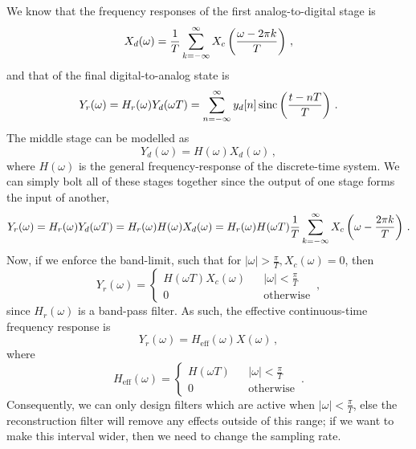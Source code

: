 We know that the frequency responses of the first analog-to-digital stage is
%
\begin{displaymath}
  X_d(\omega) = \frac{1}{T}\sum_{k=-\infty}^\infty X_c\left(\frac{\omega - 2\pi k}{T}\right) \,,
\end{displaymath}
%
and that of the final digital-to-analog state is
%
\begin{displaymath}
  Y_r(\omega) = H_r(\omega)Y_d(\omega T) = \sum_{n=-\infty}^\infty y_d[n]\operatorname{sinc}\left(\frac{t - nT}{T}\right) \,.
\end{displaymath}
%
The middle stage can be modelled as
%
\begin{displaymath}
  Y_d(\omega) = H(\omega)X_d(\omega) \,,
\end{displaymath}
%
where $H(\omega)$ is the general frequency-response of the discrete-time system.
We can simply bolt all of these stages together since the output of one
stage forms the input of another,
%
\begin{displaymath}
  Y_r(\omega) = H_r(\omega)Y_d(\omega T) = H_r(\omega)H(\omega)X_d(\omega)
  = H_r(\omega)H(\omega T)\frac{1}{T}\sum_{k=-\infty}^\infty X_c\left(\omega -\frac{2\pi k}{T}\right) \,.
\end{displaymath}
%
Now, if we enforce the band-limit, such that for $|\omega| > \frac{\pi}{T}, X_c(\omega) = 0$,
then
%
\begin{displaymath}
  Y_r(\omega) = \left\{\begin{array}{ccl}
  H(\omega T)X_c(\omega) & & |\omega| < \frac{\pi}{T} \\
  0 & & \mathrm{otherwise}
  \end{array}\right. \,,
\end{displaymath}
%
since $H_r(\omega)$ is a band-pass filter. As such, the effective continuous-time frequency
response is
%
\begin{displaymath}
  Y_r(\omega) = H_{\mathrm{eff}}(\omega)X(\omega) \,,
\end{displaymath}
%
where
%
\begin{displaymath}
  H_{\mathrm{eff}}(\omega) = \left\{\begin{array}{ccl}
  H(\omega T) & & |\omega| < \frac{\pi}{T} \\
  0 & & \mathrm{otherwise}
  \end{array}\right. \,.
\end{displaymath}
%
Consequently, we can only design filters which are active when $|\omega| < \frac{\pi}{T}$,
else the reconstruction filter will remove any effects outside of this range; if we
want to make this interval wider, then we need to change the sampling rate.
